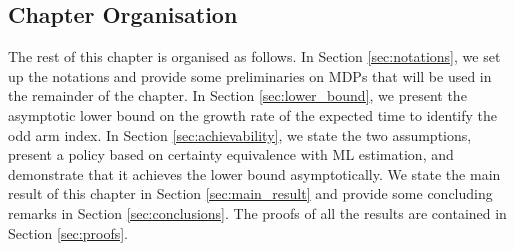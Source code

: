 \begin{enumerate}
{%
%	
}
\end{enumerate}

 
\subsection{Chapter Organisation}
The rest of this chapter is organised as follows. In Section \ref{sec:notations}, we set up the notations and provide some preliminaries on MDPs that will be used in the remainder of the chapter. In Section \ref{sec:lower_bound},  we present the asymptotic lower bound on {\color{black} the growth rate of} the expected time to identify the odd arm index. In Section \ref{sec:achievability}, we state the two assumptions, present a policy based on certainty equivalence with ML estimation, and demonstrate that it achieves the lower bound asymptotically. We state the main result of this chapter in Section \ref{sec:main_result} and provide some concluding remarks in Section \ref{sec:conclusions}. The proofs of all the results are contained in Section \ref{sec:proofs}.

